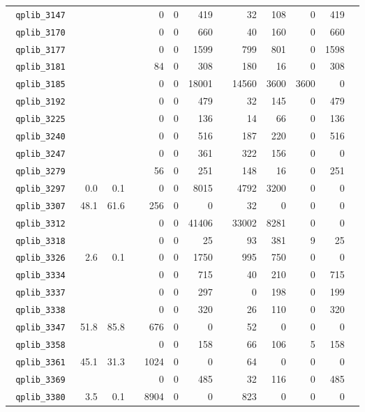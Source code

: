 {\begin{longtable}{lrrrrrrrrrrrr}
\texttt{ 	qplib\_3147	}	&		&		&	&	0	&	0	&	419	&	&	32	&	108	&	0	&	419	\\
\texttt{ 	qplib\_3170	}	&		&		&	&	0	&	0	&	660	&	&	40	&	160	&	0	&	660	\\
\texttt{ 	qplib\_3177	}	&		&		&	&	0	&	0	&	1599	&	&	799	&	801	&	0	&	1598	\\
\texttt{ 	qplib\_3181	}	&		&		&	&	84	&	0	&	308	&	&	180	&	16	&	0	&	308	\\
\texttt{ 	qplib\_3185	}	&		&		&	&	0	&	0	&	18001	&	&	14560	&	3600	&	3600	&	0	\\
\texttt{ 	qplib\_3192	}	&		&		&	&	0	&	0	&	479	&	&	32	&	145	&	0	&	479	\\
\texttt{ 	qplib\_3225	}	&		&		&	&	0	&	0	&	136	&	&	14	&	66	&	0	&	136	\\
\texttt{ 	qplib\_3240	}	&		&		&	&	0	&	0	&	516	&	&	187	&	220	&	0	&	516	\\
\texttt{ 	qplib\_3247	}	&		&		&	&	0	&	0	&	361	&	&	322	&	156	&	0	&	0	\\
\texttt{ 	qplib\_3279	}	&		&		&	&	56	&	0	&	251	&	&	148	&	16	&	0	&	251	\\
\texttt{ 	qplib\_3297	}	&	0.0	&	0.1	&	&	0	&	0	&	8015	&	&	4792	&	3200	&	0	&	0	\\
\texttt{ 	qplib\_3307	}	&	48.1	&	61.6	&	&	256	&	0	&	0	&	&	32	&	0	&	0	&	0	\\
\texttt{ 	qplib\_3312	}	&		&		&	&	0	&	0	&	41406	&	&	33002	&	8281	&	0	&	0	\\
\texttt{ 	qplib\_3318	}	&		&		&	&	0	&	0	&	25	&	&	93	&	381	&	9	&	25	\\
\texttt{ 	qplib\_3326	}	&	2.6	&	0.1	&	&	0	&	0	&	1750	&	&	995	&	750	&	0	&	0	\\
\texttt{ 	qplib\_3334	}	&		&		&	&	0	&	0	&	715	&	&	40	&	210	&	0	&	715	\\
\texttt{ 	qplib\_3337	}	&		&		&	&	0	&	0	&	297	&	&	0	&	198	&	0	&	199	\\
\texttt{ 	qplib\_3338	}	&		&		&	&	0	&	0	&	320	&	&	26	&	110	&	0	&	320	\\
\texttt{ 	qplib\_3347	}	&	51.8	&	85.8	&	&	676	&	0	&	0	&	&	52	&	0	&	0	&	0	\\
\texttt{ 	qplib\_3358	}	&		&		&	&	0	&	0	&	158	&	&	66	&	106	&	5	&	158	\\
\texttt{ 	qplib\_3361	}	&	45.1	&	31.3	&	&	1024	&	0	&	0	&	&	64	&	0	&	0	&	0	\\
\texttt{ 	qplib\_3369	}	&		&		&	&	0	&	0	&	485	&	&	32	&	116	&	0	&	485	\\
\texttt{ 	qplib\_3380	}	&	3.5	&	0.1	&	&	8904	&	0	&	0	&	&	823	&	0	&	0	&	0	\\

\end{longtable}}
